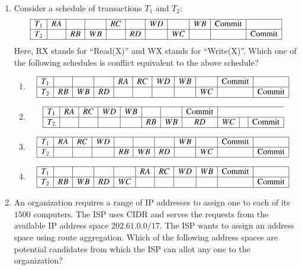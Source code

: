 \documentclass[journal,12pt,onecolumn]{IEEEtran}
\theoremstyle{remark}
\begin{document}
\begin{enumerate}
\item Consider a schedule of transactions \( T_1 \) and \( T_2 \):
\[
\begin{array}{|c|c|c|c|c|c|c|c|c|c|c|}
	\hline
	T_1 & RA &	&	& RC &  & WD &  & WB & \text{Commit} &    \\
	\hline
	T_2 &  & RB & WB &  & RD &  & WC &  &  & \text{Commit} \\
	\hline
\end{array}
\]
Here, RX stands for ``Read(X)'' and WX stands for ``Write(X)''. Which one of the following schedules is conflict equivalent to the above schedule?
\hfill{}
\begin{enumerate}[label=(\Alph*)]
	\item \[
	\begin{array}{|c|c|c|c|c|c|c|c|c|c|c|}
		\hline
		T_1 &  &  &  & RA & RC & WD & WB &  &\text{Commit}& \\
		\hline
		T_2 & RB & WB & RD &  &  &  &  & WC &  & \text{Commit} \\
		\hline
	\end{array}
	\]
	
	\item \[
	\begin{array}{|c|c|c|c|c|c|c|c|c|c|c|}
		\hline
		T_1 & RA & RC & WD & WB &  &  & \text{Commit} \\
		\hline
		T_2 &  &  &  &  & RB & WB & RD & WC &  & \text{Commit} \\
		\hline
	\end{array}
	\]
	
	\item \[
	\begin{array}{|c|c|c|c|c|c|c|c|c|c|c|}
		\hline
		T_1 & RA & RC & WD &  & & & WB &  &  \text{Commit} &   \\
		\hline
		T_2 &  &  &  & RB & WB & RD& & WC &  & \text{Commit} \\
		\hline
	\end{array}
	\]
	
	\item \[
	\begin{array}{|c|c|c|c|c|c|c|c|c|c|c|}
		\hline
		T_1&   &   &  &  & RA & RC & WD & WB & \text{Commit} &   \\
		\hline
		T_2 & RB & WB & RD & WC &  &  &  &  &  & \text{Commit} \\
		\hline
	\end{array}
	\]
\end{enumerate}


\item An organization requires a range of IP addresses to assign one to each of its $1500$ computers. The ISP uses CIDR and serves the requests from the available IP address space $202.61.0.0/17$. The ISP wants to assign an address space using route aggregation. Which of the following address spaces are potential candidates from which the ISP can allot any one to the organization?  


\end{enumerate}
\end{document}
